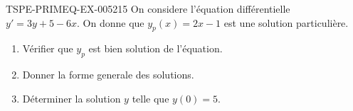 \begin{exercice}{TSPE-PRIMEQ-EX-005}{2}{15}
On considere l'équation différentielle $y' = 3y + 5 - 6x$. On donne que $y_p(x) = 2x-1$ est une solution particulière.
\begin{enumerate}
  \item Vérifier que $y_p$ est bien solution de l'équation.
  \item Donner la forme generale des solutions.
  \item Déterminer la solution $y$ telle que $y(0) = 5$.
\end{enumerate}
\end{exercice}
